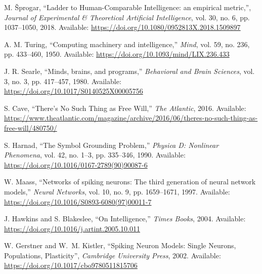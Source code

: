 \documentclass{article}
\begin{document}
\begin{thebibliography}{99}

M. Šprogar, 
``Ladder to Human-Comparable Intelligence: an empirical metric,'', 
\textit{Journal of Experimental \& Theoretical Artificial Intelligence},
vol. 30, no. 6, pp. 1037--1050, 2018. Available: \url{https://doi.org/10.1080/0952813X.2018.1509897}

A. M. Turing, 
``Computing machinery and intelligence,'' 
\textit{Mind}, vol. 59, no. 236, pp. 433--460, 1950. Available: \url{https://doi.org/10.1093/mind/LIX.236.433}

J. R. Searle, 
``Minds, brains, and programs,'' 
\textit{Behavioral and Brain Sciences}, vol. 3, no. 3, pp. 417--457, 1980. Available: \url{https://doi.org/10.1017/S0140525X00005756}

S. Cave, 
``There’s No Such Thing as Free Will,''
\textit{The Atlantic},
2016. Available: \url{https://www.theatlantic.com/magazine/archive/2016/06/theres-no-such-thing-as-free-will/480750/}

S. Harnad, 
``The Symbol Grounding Problem,'' 
\textit{Physica D: Nonlinear Phenomena}, vol. 42, no. 1--3, pp. 335--346, 1990. Available: \url{https://doi.org/10.1016/0167-2789(90)90087-6}

W. Maass, 
``Networks of spiking neurons: The third generation of neural network models,'' 
\textit{Neural Networks}, vol. 10, no. 9, pp. 1659--1671, 1997. Available: \url{https://doi.org/10.1016/S0893-6080(97)00011-7}

J. Hawkins and S. Blakeslee,
``On Intelligence,'' 
\textit{Times Books}, 2004. Available: \url{https://doi.org/10.1016/j.artint.2005.10.011}

W. Gerstner and W.~M. Kistler,
``Spiking Neuron Models: Single Neurons, Populations, Plasticity'',
\textit{Cambridge University Press}, 2002. Available:
\url{https://doi.org/10.1017/cbo9780511815706}


\end{thebibliography}
\end{document}
